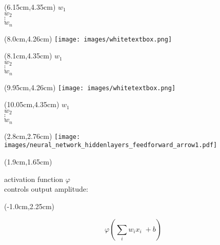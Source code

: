 \documentclass{beamer}
\begin{document}
{\begin{textblock*}{2.7cm}(6.15cm,4.35cm) %
$w_1$\\  
$w_2$\\ 
$\vdots$\\ 
$w_n$
\end{textblock*}


%
%
\begin{textblock*}{0.65cm}(8.0cm,4.26cm) %
\texttt{[image: images/whitetextbox.png]}
\end{textblock*}

\begin{textblock*}{2.7cm}(8.1cm,4.35cm) %
$w_1$\\  
$w_2$\\ 
$\vdots$\\ 
$w_n$
\end{textblock*}

%
%
\begin{textblock*}{0.65cm}(9.95cm,4.26cm) %
\texttt{[image: images/whitetextbox.png]}
\end{textblock*}

\begin{textblock*}{2.7cm}(10.05cm,4.35cm) %
$w_1$\\  
$w_2$\\ 
$\vdots$\\ 
$w_n$
\end{textblock*}




\begin{textblock*}{1.86cm}(2.8cm,2.76cm) %
\texttt{[image: images/neural\_network\_hiddenlayers\_feedforward\_arrow1.pdf]}
\end{textblock*}



\begin{textblock*}{7.7cm}(1.9cm,1.65cm) %
\begin{footnotesize}
activation function $\varphi$ \\ \vspace{-0.15cm} controls output amplitude:
\end{footnotesize}
\end{textblock*}


\begin{textblock*}{7.7cm}(-1.0cm,2.25cm) %
\begin{footnotesize}
\begin{equation*}
\varphi(\sum_i w_i x_i  \; + b)
\end{equation*}
\end{footnotesize}
\end{textblock*}


}
\end{document}
